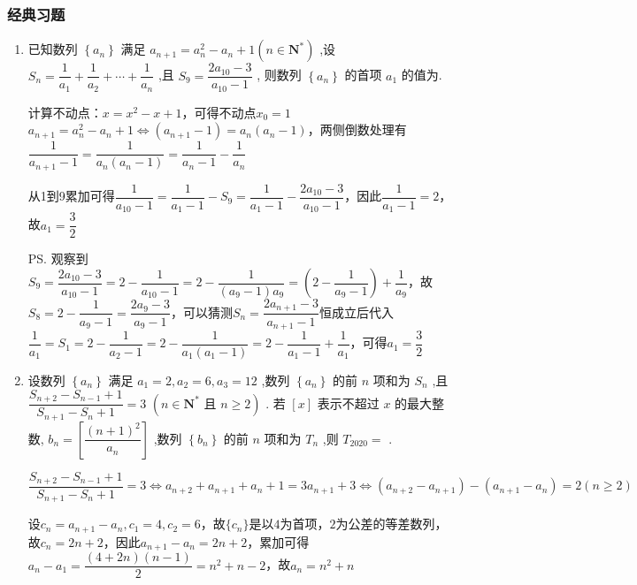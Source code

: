 \subsubsection*{经典习题}
\begin{enumerate}
    \item 已知数列 $\left\{  {a}_{n}\right\}$ 满足 ${a}_{n + 1} = {a}_{n}^{2} - {a}_{n} + 1\left( {n \in  {\mathbf{N}}^{ * }}\right)$ ,设 ${S}_{n} = \dfrac{1}{{a}_{1}} + \dfrac{1}{{a}_{2}} + \cdots  + \dfrac{1}{{a}_{n}}$ ,且 ${S}_{9} = \dfrac{2{a}_{10} - 3}{{a}_{10} - 1}$ , 则数列 $\left\{  {a}_{n}\right\}$ 的首项 ${a}_{1}$ 的值为.
    \begin{jieda}
        计算不动点：$x = x^2-x+1$，可得不动点$x_0 = 1$
        ${a}_{n + 1} = {a}_{n}^{2} - {a}_{n} + 1 \Longleftrightarrow (a_{n+1} - 1) = a_n (a_n -1)$，两侧倒数处理有$\dfrac{1}{a_{n+1} - 1} = \dfrac{1}{a_n (a_n -1)} = \dfrac{1}{a_n - 1} - \dfrac{1}{a_n}$

        从1到9累加可得$\dfrac{1}{a_{10}-1} = \dfrac{1}{a_1-1} - S_9 = \dfrac{1}{a_1-1} - \dfrac{2{a}_{10} - 3}{{a}_{10} - 1}$，因此$\dfrac{1}{a_1 - 1} = 2$，故$a_1 = \dfrac{3}{2}$

        \ps 观察到${S}_{9} = \dfrac{2{a}_{10} - 3}{{a}_{10} - 1} = 2 - \dfrac{1}{a_{10}-1} = 2 - \dfrac{1}{(a_9-1)a_9} = \left(2-\dfrac{1}{a_9 - 1}\right) + \dfrac{1}{a_9}$，故$S_8 = 2-\dfrac{1}{a_9 - 1} = \dfrac{2a_9 - 3}{a_9 - 1}$，可以猜测$S_n = \dfrac{2a_{n+1} - 3}{a_{n+1} - 1}$恒成立后代入$\dfrac{1}{a_1} = S_1 = 2 - \dfrac{1}{a_2 - 1} = 2 - \dfrac{1}{a_1(a_1-1)} = 2 - \dfrac{1}{a_1-1}+\dfrac{1}{a_1}$，可得$a_1 = \dfrac{3}{2}$
    \end{jieda}
    \item 设数列 $\left\{  {a}_{n}\right\}$ 满足 ${a}_{1} = 2,{a}_{2} = 6,{a}_{3} = {12}$ ,数列 $\left\{  {a}_{n}\right\}$ 的前 $n$ 项和为 ${S}_{n}$ ,且 $\dfrac{{S}_{n + 2} - {S}_{n - 1} + 1}{{S}_{n + 1} - {S}_{n} + 1} = 3$  $\left( {n \in  {\mathbf{N}}^{ * }\text{ 且 }n \geq  2}\right)$ . 若 $\left\lbrack  x\right\rbrack$ 表示不超过 $x$ 的最大整数, ${b}_{n} = \left\lbrack  \dfrac{{\left( n + 1\right) }^{2}}{{a}_{n}}\right\rbrack$ ,数列 $\left\{  {b}_{n}\right\}$ 的前 $n$ 项和为 ${T}_{n}$ ,则 ${T}_{2020} =$ .
    \begin{jieda}
        $\dfrac{{S}_{n + 2} - {S}_{n - 1} + 1}{{S}_{n + 1} - {S}_{n} + 1} = 3 \Longleftrightarrow a_{n+2} + a_{n+1} + a_n + 1 = 3a_{n+1} + 3 \Longleftrightarrow (a_{n+2} - a_{n+1})-(a_{n+1} - a_n) = 2 (n \geq 2)$
        
        设$c_n = a_{n+1} - a_n, c_1 = 4, c_2 = 6$，故$\{c_n\}$是以$4$为首项，$2$为公差的等差数列，故$c_n = 2n+2$，因此$a_{n+1} - a_n = 2n+2$，累加可得$a_n - a_1 = \dfrac{(4+2n)(n-1)}{2} = n^2 + n - 2$，故$a_n = n^2 + n$


\end{jieda}
\end{enumerate}
